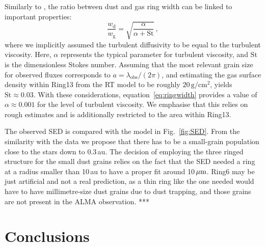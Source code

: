 \documentclass[letters,usenatbib,times]{mnras}
\begin{document}
Similarly to \citet{2018ApJ...869L..46D}, the ratio between dust and gas ring width can be linked to important properties:
\begin{equation}\label{eq:ringwidth}
        \frac{w_\mathrm{d}}{w_\mathrm{g}} = \sqrt{\frac{\alpha}{\alpha+\mathrm{St}}}\,,
\end{equation}
where we implicitly assumed the turbulent diffusivity to be equal to the turbulent viscosity. Here, $\alpha$ represents the typical parameter for turbulent viscosity, and $\mathrm{St}$ is the dimensionless Stokes number. Assuming that the most relevant grain size for observed fluxes corresponds to $a = \lambda_{\mathrm{obs}}/(2 \pi)$, and estimating the gas surface density within Ring13 from the RT model to be roughly $20\,\mathrm{g}/\mathrm{cm}^2$, yields $\mathrm{St}\approx 0.03$. With these considerations, equation~\ref{eq:ringwidth} provides a value of $\alpha \approx 0.001$ for the level of turbulent viscosity. We emphasise that this relies on rough estimates and is additionally restricted to the area within Ring13.

The observed SED is compared with the model in Fig.~\ref{fig:SED}. From the similarity with the data we propose that there has to be a small-grain population close to the stars down to 0.3\,au. The decision of employing the three ringed structure for the small dust grains relies on the fact that the SED needed a ring at a radius smaller than 10\,au to have a proper fit around 10\,$\hbox{$\mu$m}$.
Ring6 may be just artificial and not a real prediction, as a thin ring like the one needed would have to have millimetre-size dust grains due to dust trapping, and those grains are not present in the ALMA observation. *** 

\section{Conclusions} \label{sec:Conclusions}
\end{document}
